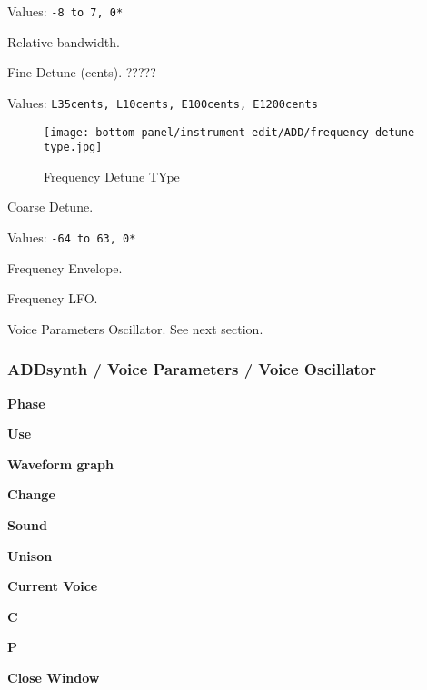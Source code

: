    Values: \texttt{-8 to 7, 0*}

   Relative bandwidth.

   Fine Detune (cents). ?????

   Values: \texttt{L35cents, L10cents, E100cents, E1200cents}

\begin{figure}[H]
   \centering 
   \texttt{[image: bottom-panel/instrument-edit/ADD/frequency-detune-type.jpg]}
   \caption{Frequency Detune TYpe}
   \label{fig:frequency_detune_tYpe}
\end{figure}

   Coarse Detune.

   Values: \texttt{-64 to 63, 0*}

   Frequency Envelope.

   Frequency LFO.

   Voice Parameters Oscillator.
   See next section.

\subsubsection{ADDsynth / Voice Parameters / Voice Oscillator}
\label{subsubsec:addsynth_voice_parameters_oscillator}

   \begin{enumber}
      \item \textbf{Phase}
      \item \textbf{Use}
      \item \textbf{Waveform graph}
      \item \textbf{Change}
      \item \textbf{Sound}
      \item \textbf{Unison}
      \item \textbf{Current Voice}
      \item \textbf{C}
      \item \textbf{P}
      \item \textbf{Close Window}
   \end{enumber}

   \setcounter{ItemCounter}{0}      %

